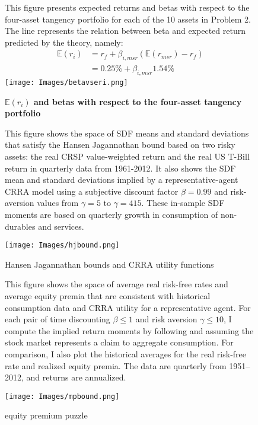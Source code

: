 \documentclass[12pt]{article}
\newcommand{\E}{\mathbb{E}}
\begin{document}
\clearpage

\begin{figure}[h]
\caption{\textbf{$\E(r_i)$ and betas with respect to the four-asset tangency portfolio}} \label{figure_ervsbeta}
\small{This figure presents expected returns and betas with respect to the four-asset tangency portfolio for each of the 10 assets in Problem 2. The line represents the relation between beta and expected return predicted by the theory, namely:
\begin{align*}
\mathbb{E}(r_{i}) &= r_f + \beta_{i,msr} \left( \mathbb{E}(r_{msr}) - r_f \right) \\
&= 0.25\% + \beta_{i,msr} 1.54\%
\end{align*}
}
\vspace{12pt}
\texttt{[image: Images/betavseri.png]}
\end{figure}

\clearpage

\begin{figure}[h]
\caption{Hansen Jagannathan bounds and CRRA utility functions} \label{figure_hjbound}
\small{This figure shows the space of SDF means and standard deviations that satisfy the Hansen Jagannathan bound based on two risky assets: the real CRSP value-weighted return and the real US T-Bill return in quarterly data from 1961-2012. It also shows the SDF mean and standard deviations implied by a representative-agent CRRA model using a subjective discount factor $\beta = 0.99$ and risk-aversion values from $\gamma = 5$ to $\gamma = 415$. These in-sample SDF moments are based on quarterly growth in consumption of non-durables and services.
}
\vspace{12pt}

\texttt{[image: Images/hjbound.png]}
\end{figure}

\clearpage


\begin{figure}[h]
\caption{\cite{mehra1985equity} equity premium puzzle} \label{figure_mpbound}
\small{This figure shows the space of average real risk-free rates and average equity premia that are consistent with historical consumption data and CRRA utility for a representative agent. For each pair of time discounting $\beta \leq 1$ and risk aversion $\gamma \leq 10$, I compute the implied return moments by following \cite{mehra1985equity} and assuming the stock market represents a claim to aggregate consumption. For comparison, I also plot the historical averages for the real risk-free rate and realized equity premia. The data are quarterly from 1951--2012, and returns are annualized.
}
\vspace{12pt}

\texttt{[image: Images/mpbound.png]}
\end{figure}
\end{document}
